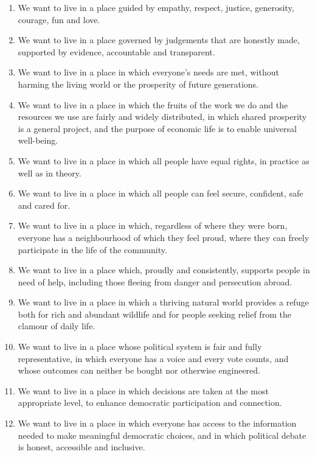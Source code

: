 


\begin{enumerate}
	\item We want to live in a place guided by empathy, respect, justice, generosity, courage, fun and love.
	\item We want to live in a place governed by judgements that are honestly made, supported by evidence, accountable and transparent.
	\item We want to live in a place in which everyone’s needs are met, without harming the living world or the prosperity of future generations.
	\item We want to live in a place in which the fruits of the work we do and the resources we use are fairly and widely distributed, in which shared prosperity is a general project, and the purpose of economic life is to enable universal well-being.
	\item We want to live in a place in which all people have equal rights, in practice as well as in theory.
	\item We want to live in a place in which all people can feel secure, confident, safe and cared for.
	\item We want to live in a place in which, regardless of where they were born, everyone has a neighbourhood of which they feel proud, where they can freely participate in the life of the community.
	\item We want to live in a place which, proudly and consistently, supports people in need of help, including those fleeing from danger and persecution abroad.
	\item We want to live in a place in which a thriving natural world provides a refuge both for rich and abundant wildlife and for people seeking relief from the clamour of daily life.
	\item We want to live in a place whose political system is fair and fully representative, in which everyone has a voice and every vote counts, and whose outcomes can neither be bought nor otherwise engineered.
	\item We want to live in a place in which decisions are taken at the most appropriate level, to enhance democratic participation and connection.
	\item We want to live in a place in which everyone has access to the information needed to make meaningful democratic choices, and in which political debate is honest, accessible and inclusive.

\end{enumerate}

